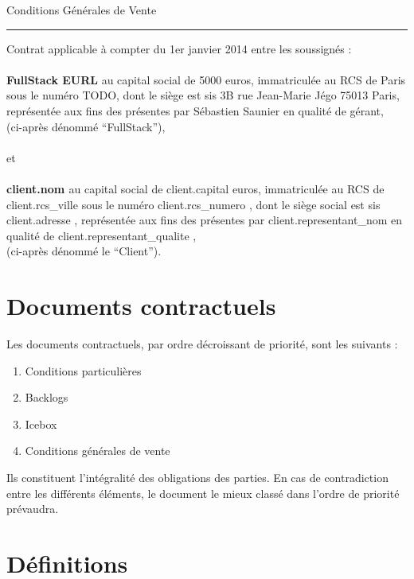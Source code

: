 \documentclass[11pt]{article}
\begin{document}
\begin{center}
{\Large Conditions Générales de Vente}
\end{center}

\hrule height .1mm

\vspace{.5cm}

\noindent Contrat applicable à compter du 1er janvier 2014 entre les soussignés :
\\
\\
{\textbf{FullStack EURL} au capital social de 5000 euros, immatriculée au RCS de Paris sous le numéro TODO, dont le siège est sis 3B rue Jean-Marie Jégo 75013 Paris, représentée aux fins des présentes par Sébastien Saunier en qualité de gérant,
}
\\
(ci-après dénommé ``FullStack''),
\\
\\
et
\\
\\
{\textbf{ {{ client.nom }} } au capital social de {{ client.capital }} euros, immatriculée au RCS de {{ client.rcs_ville }} sous le numéro {{ client.rcs_numero }}, dont le siège social est sis {{ client.adresse }}, représentée aux fins des présentes par {{ client.representant_nom }} en qualité de {{ client.representant_qualite }},
}
\\
(ci-après dénommé le ``Client'').


\section{Documents contractuels}

Les documents contractuels, par ordre décroissant de priorité, sont les suivants :

\begin{enumerate}
  \item Conditions particulières
  \item Backlogs
  \item Icebox
  \item Conditions générales de vente
\end{enumerate}

Ils constituent l’intégralité des obligations des parties. En cas de contradiction entre les différents éléments, le document le mieux classé dans l’ordre de priorité prévaudra.

\section{Définitions}
\end{document}
